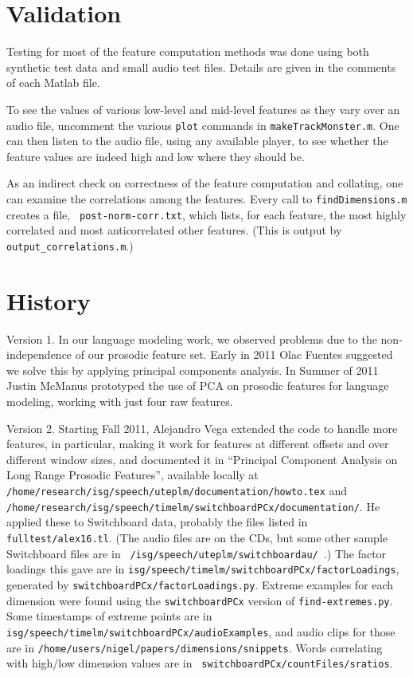 \documentclass[11pt]{article}
\begin{document}
\section{Validation}

Testing for most of the feature computation methods was done using
both synthetic test data and small audio test files.  Details are
given in the comments of each Matlab file.

To see the values of various low-level and mid-level features as they
vary over an audio file, uncomment the various {\tt plot} commands in
{\tt makeTrackMonster.m}.  One can then listen to the audio file,
using any available player, to see whether the feature values are
indeed high and low where they should be.

As an indirect check on correctness of the feature computation and
collating, one can examine the correlations among the features.  Every
call to {\tt findDimensions.m} creates a file, {\tt
  post-norm-corr.txt}, which lists, for each feature, the most highly
correlated and most anticorrelated other features.  (This is output by
{\tt output\_correlations.m}.)


\section{History}

Version 1.  In our language  modeling work, we observed
problems due to the non-independence of our prosodic feature set.
Early in 2011 Olac Fuentes suggested we solve this by applying
principal components analysis.  In Summer of 2011 Justin McManus
prototyped the use of PCA on prosodic features for language modeling,
working with just four raw features.

Version 2. Starting Fall 2011, Alejandro Vega extended the code to
handle more features, in particular, making it work for features at
different offsets and over different window sizes, and documented it
in ``Principal Component Analysis on Long Range Prosodic Features'',
available locally at {\tt
  /home/research/isg/speech/uteplm/documentation/howto.tex} and {\tt
  /home/research/isg/speech/timelm/switchboardPCx/documentation/}.  He
applied these to Switchboard data, probably the files listed in {\tt
  fulltest/alex16.tl}.  (The audio files are on the CDs, but some
other sample Switchboard files are in {\tt
  /isg/speech/uteplm/switchboardau/ }.)  The factor loadings this
gave are in {\tt isg/speech/timelm/switchboardPCx/factorLoadings},
generated by {\tt switchboardPCx/factorLoadings.py}.  Extreme examples
for each dimension were found using the {\tt switchboardPCx} version
of {\tt find-extremes.py}.  Some timestamps of extreme points are in
{\tt isg/speech/timelm/switchboardPCx/audioExamples}, and audio clips
for those are in {\tt /home/users/nigel/papers/dimensions/snippets}.
Words correlating with high/low dimension values are in {\tt
  switchboardPCx/countFiles/sratios}.
\end{document}
